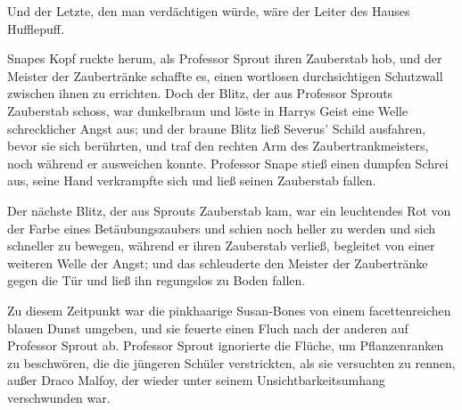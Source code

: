 Und der Letzte, den man verdächtigen würde, wäre der Leiter des Hauses Hufflepuff.

Snapes Kopf ruckte herum, als Professor Sprout ihren Zauberstab hob, und der Meister der Zaubertränke schaffte es, einen wortlosen durchsichtigen Schutzwall zwischen ihnen zu errichten. Doch der Blitz, der aus Professor Sprouts Zauberstab schoss, war dunkelbraun und löste in Harrys Geist eine Welle schrecklicher Angst aus; und der braune Blitz ließ Severus' Schild ausfahren, bevor sie sich berührten, und traf den rechten Arm des Zaubertrankmeisters, noch während er ausweichen konnte.
Professor Snape stieß einen dumpfen Schrei aus, seine Hand verkrampfte sich und ließ seinen Zauberstab fallen.

Der nächste Blitz, der aus Sprouts Zauberstab kam, war ein leuchtendes Rot von der Farbe eines Betäubungszaubers und schien noch heller zu werden und sich schneller zu bewegen, während er ihren Zauberstab verließ, begleitet von einer weiteren Welle der Angst; und das schleuderte den Meister der Zaubertränke gegen die Tür und ließ ihn regungslos zu Boden fallen.

Zu diesem Zeitpunkt war die pinkhaarige Susan-Bones von einem facettenreichen blauen Dunst umgeben, und sie feuerte einen Fluch nach der anderen auf Professor Sprout ab. Professor Sprout ignorierte die Flüche, um Pflanzenranken zu beschwören, die die jüngeren Schüler verstrickten, als sie versuchten zu rennen, außer Draco Malfoy, der wieder unter seinem Unsichtbarkeitsumhang verschwunden war.

